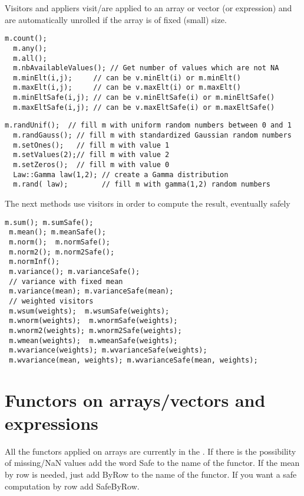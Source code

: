 \documentclass[a4paper,10pt]{article}
\begin{document}
Visitors and appliers visit/are applied to an array or vector (or expression)
and are automatically unrolled if the array is of fixed (small) size.

\begin{lstlisting}[style=customcpp,caption=Visitors]
  m.count();
  m.any();
  m.all();
  m.nbAvailableValues(); // Get number of values which are not NA
  m.minElt(i,j);     // can be v.minElt(i) or m.minElt()
  m.maxElt(i,j);     // can be v.maxElt(i) or m.maxElt()
  m.minEltSafe(i,j); // can be v.minEltSafe(i) or m.minEltSafe()
  m.maxEltSafe(i,j); // can be v.maxEltSafe(i) or m.maxEltSafe()
\end{lstlisting}

\begin{lstlisting}[style=customcpp,caption=Appliers]
  m.randUnif();  // fill m with uniform random numbers between 0 and 1
  m.randGauss(); // fill m with standardized Gaussian random numbers
  m.setOnes();   // fill m with value 1
  m.setValues(2);// fill m with value 2
  m.setZeros();  // fill m with value 0
  Law::Gamma law(1,2); // create a Gamma distribution
  m.rand( law);        // fill m with gamma(1,2) random numbers
\end{lstlisting}

The next methods use visitors in order to compute the result, eventually safely
\begin{lstlisting}[style=customcpp]
 m.sum(); m.sumSafe();
 m.mean(); m.meanSafe();
 m.norm();  m.normSafe();
 m.norm2(); m.norm2Safe();
 m.normInf();
 m.variance(); m.varianceSafe();
 // variance with fixed mean
 m.variance(mean); m.varianceSafe(mean);
 // weighted visitors
 m.wsum(weights);  m.wsumSafe(weights);
 m.wnorm(weights);  m.wnormSafe(weights);
 m.wnorm2(weights); m.wnorm2Safe(weights);
 m.wmean(weights);  m.wmeanSafe(weights);
 m.wvariance(weights); m.wvarianceSafe(weights);
 m.wvariance(mean, weights); m.wvarianceSafe(mean, weights);
\end{lstlisting}

\section{Functors on arrays/vectors and expressions}

All the functors applied on arrays are currently in the .
If there is the possibility of missing/NaN values add the word
Safe to the name of the functor. If the mean by row is needed, just add ByRow
to the name of the functor. If you want a safe computation by row add SafeByRow.
\end{document}
